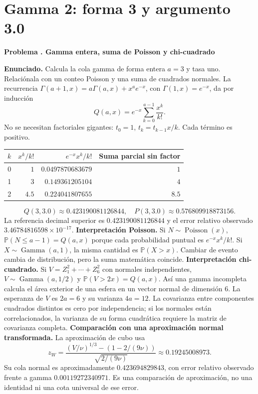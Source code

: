 \documentclass[11pt,a4paper]{article}
\newcommand{\Prob}{\mathbb P}
\theoremstyle{definition}
\newcounter{problema}
\newenvironment{resuelto}[1]{\refstepcounter{problema}\par\medskip\Needspace{6\baselineskip}\textbf{Problema \theproblema. #1}\par}{\par\medskip}
\begin{document}
\section{Gamma 2: forma 3 y argumento 3.0}
\begin{resuelto}{Gamma entera, suma de Poisson y chi-cuadrado}
\textbf{Enunciado.} Calcula la cola gamma de forma entera $a=3$ y tasa uno. Relaciónala con un conteo Poisson y una suma de cuadrados normales.
La recurrencia $\Gamma(a+1,x)=a\Gamma(a,x)+x^ae^{-x}$, con $\Gamma(1,x)=e^{-x}$, da por inducción
\[
Q(a,x)=e^{-x}\sum_{k=0}^{a-1}\frac{x^k}{k!}.
\]
No se necesitan factoriales gigantes: $t_0=1$, $t_k=t_{k-1}x/k$. Cada término es positivo.

\begin{center}\small\begin{tabular}{rrrr}
\toprule
$k$&$x^k/k!$&$e^{-x}x^k/k!$&Suma parcial sin factor\\
\midrule
0&$1$&$0.0497870683679$&$1$\\
1&$3$&$0.149361205104$&$4$\\
2&$4.5$&$0.224041807655$&$8.5$\\
\bottomrule\end{tabular}\end{center}
\[
Q(3,3.0)\approx0.423190081126844,\quad
P(3,3.0)\approx0.576809918873156.
\]
La referencia decimal superior es $0.423190081126844$ y el error relativo observado $3.46784816598\times10^{-17}$.
\textbf{Interpretación Poisson.} Si $N\sim\operatorname{Poisson}(x)$, $\Prob(N\le a-1)=Q(a,x)$ porque cada probabilidad puntual es $e^{-x}x^k/k!$. Si $X\sim\operatorname{Gamma}(a,1)$, la misma cantidad es $\Prob(X>x)$. Cambiar de evento cambia de distribución, pero la suma matemática coincide.
\textbf{Interpretación chi-cuadrado.} Si $V=Z_1^2+\cdots+Z_{6}^2$ con normales independientes, $V\sim\operatorname{Gamma}(a,1/2)$ y $\Prob(V>2x)=Q(a,x)$. Así una gamma incompleta calcula el área exterior de una esfera en un vector normal de dimensión 6.
La esperanza de $V$ es $2a=6$ y su varianza $4a=12$. La covarianza entre componentes cuadrados distintos es cero por independencia; si los normales están correlacionados, la varianza de su forma cuadrática requiere la matriz de covarianza completa.
\textbf{Comparación con una aproximación normal transformada.} La aproximación de cubo usa
\[
z_W=\frac{(V/\nu)^{1/3}-(1-2/(9\nu))}{\sqrt{2/(9\nu)}}\approx0.19245008973.
\]
Su cola normal es aproximadamente $0.423694829843$, con error relativo observado frente a gamma $0.00119272340971$. Es una comparación de aproximación, no una identidad ni una cota universal de ese error.
\end{resuelto}
\end{document}
